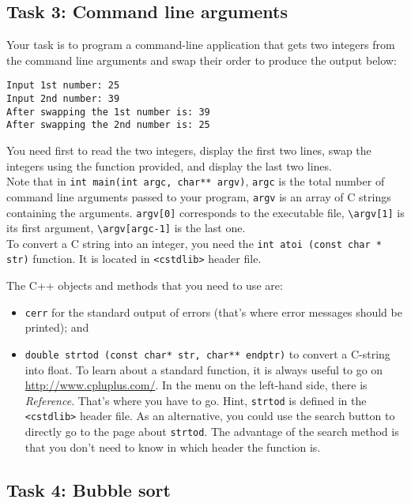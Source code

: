 \subsection*{Task 3: Command line arguments}

Your task is to program a command-line application that gets two integers from the command line arguments and swap their order to produce the output below:
\begin{verbatim}
Input 1st number: 25
Input 2nd number: 39
After swapping the 1st number is: 39
After swapping the 2nd number is: 25 
\end{verbatim}

You need first to read the two integers, display the first two lines, swap the integers using the function provided, and display the last two lines.\\

Note that in \verb+int main(int argc, char** argv)+, \verb+argc+ is the total number of command line arguments passed to your program, \verb+argv+ is an array of C strings containing the arguments. \verb+argv[0]+ corresponds to the executable file, \verb+\argv[1]+ is its first argument,  \verb+\argv[argc-1]+ is the last one.\\

To convert a C string into an integer, you need the \verb+int atoi (const char * str)+ function. It is located in \verb+<cstdlib>+ header file. 

The C++ objects and methods that you need to use are:
\begin{itemize}
\item \verb+cerr+ for the standard output of errors (that's where error messages should be printed); and 
\item \verb+double strtod (const char* str, char** endptr)+ to convert a C-string into float. To learn about a standard function, it is always useful to go on \url{http://www.cpluplus.com/}. In the menu on the left-hand side, there is \emph{Reference}. That's where you have to go. Hint, \verb+strtod+ is defined in the \verb+<cstdlib>+ header file. As an alternative, you could use the search button to directly go to the page about \verb+strtod+. The advantage of the search method is that you don't need to know in which header the function is.
\end{itemize}


\subsection*{Task 4: Bubble sort}

